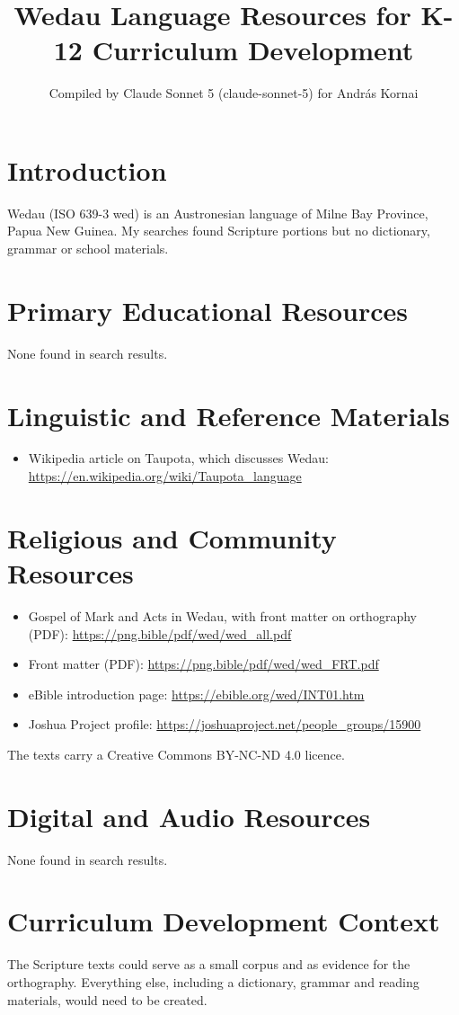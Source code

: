 \documentclass[12pt]{article}
\title{Wedau Language Resources for K-12 Curriculum Development}
\author{Compiled by Claude Sonnet 5 (claude-sonnet-5) for Andr\'as Kornai}
\date{}
\begin{document}
\maketitle
\section{Introduction}
Wedau (ISO 639-3 wed) is an Austronesian language of Milne Bay Province, Papua New Guinea. My searches found Scripture portions but no dictionary, grammar or school materials.
\section{Primary Educational Resources}
None found in search results.
\section{Linguistic and Reference Materials}
\begin{itemize}
\item Wikipedia article on Taupota, which discusses Wedau: \url{https://en.wikipedia.org/wiki/Taupota_language}
\end{itemize}
\section{Religious and Community Resources}
\begin{itemize}
\item Gospel of Mark and Acts in Wedau, with front matter on orthography (PDF): \url{https://png.bible/pdf/wed/wed_all.pdf}
\item Front matter (PDF): \url{https://png.bible/pdf/wed/wed_FRT.pdf}
\item eBible introduction page: \url{https://ebible.org/wed/INT01.htm}
\item Joshua Project profile: \url{https://joshuaproject.net/people_groups/15900}
\end{itemize}
The texts carry a Creative Commons BY-NC-ND 4.0 licence.
\section{Digital and Audio Resources}
None found in search results.
\section{Curriculum Development Context}
The Scripture texts could serve as a small corpus and as evidence for the orthography. Everything else, including a dictionary, grammar and reading materials, would need to be created.
\end{document}

